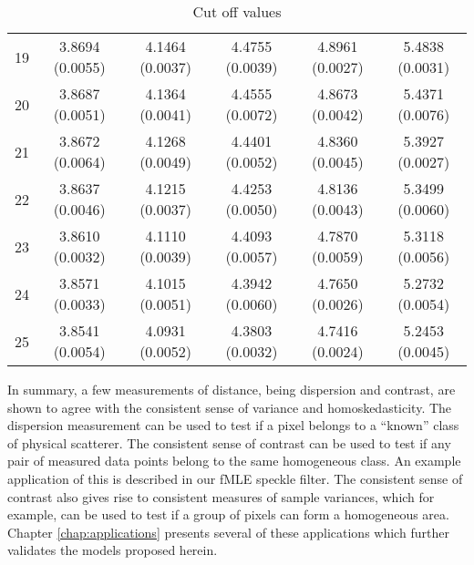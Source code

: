 \begin{table}[H]
\begin{tabular}{c|c|c|c|c|c}
19  &3.8694 (0.0055)  &4.1464 (0.0037)  &4.4755 (0.0039)  &4.8961 (0.0027)  &5.4838 (0.0031)\\
20  &3.8687 (0.0051)  &4.1364 (0.0041)  &4.4555 (0.0072)  &4.8673 (0.0042)  &5.4371 (0.0076)\\
21  &3.8672 (0.0064)  &4.1268 (0.0049)  &4.4401 (0.0052)  &4.8360 (0.0045)  &5.3927 (0.0027)\\
22  &3.8637 (0.0046)  &4.1215 (0.0037)  &4.4253 (0.0050)  &4.8136 (0.0043)  &5.3499 (0.0060)\\
23  &3.8610 (0.0032)  &4.1110 (0.0039)  &4.4093 (0.0057)  &4.7870 (0.0059)  &5.3118 (0.0056)\\
24  &3.8571 (0.0033)  &4.1015 (0.0051)  &4.3942 (0.0060)  &4.7650 (0.0026)  &5.2732 (0.0054)\\
25  &3.8541 (0.0054)  &4.0931 (0.0052)  &4.3803 (0.0032)  &4.7416 (0.0024)  &5.2453 (0.0045)
\end{tabular}

\caption{Cut off values}
\label{tab:var_cut_off_values}
\end{table}

In summary, a few measurements of distance, being dispersion and contrast, are shown to agree with the consistent sense of variance and homoskedasticity.
The dispersion measurement can be used to test 
if a pixel belongs to a ``known'' class of physical scatterer.
The consistent sense of contrast can be used to test if any pair of measured data points belong to  the same homogeneous class.
An example application of this is described in our fMLE speckle filter.
The consistent sense 
of contrast also gives rise to consistent measures of sample variances, which for example, can be used to test 
if a group of pixels can form a homogeneous area.
Chapter \ref{chap:applications} presents several of these applications which further validates the models proposed herein.
